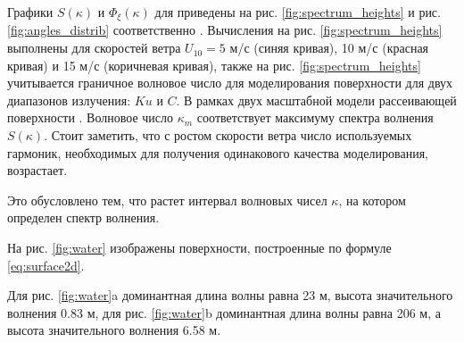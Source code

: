 Графики $S(\kappa)$ и  $\Phi_\xi(\kappa)$ для приведены на рис.
\ref{fig:spectrum_heights} и рис. \ref{fig:angles_distrib} соответственно
\cite{rybkova}. 
Вычисления на рис. \ref{fig:spectrum_heights} выполнены для скоростей ветра 
$U_{10} = 5$ м/с (синяя кривая), 10 м/с (красная кривая) и 15 м/с (коричневая
кривая), также на  рис. \ref{fig:spectrum_heights} учитывается граничное волновое число
для моделирования поверхности для двух диапазонов излучения: $Ku$ и $C$. В
рамках двух масштабной модели  рассеивающей поверхности \cite{bass-and-fuks}.
Волновое число $\kappa_m$ соответствует  максимуму спектра волнения  $S(\kappa)$. Стоит
заметить, что с ростом скорости ветра число используемых гармоник, необходимых
для получения одинакового качества моделирования,
возрастает. 

Это обусловлено тем, что растет интервал волновых чисел $\kappa$, на котором
определен спектр волнения. 

На рис. \ref{fig:water} изображены поверхности,
построенные по формуле \eqref{eq:surface2d}.

Для рис. \ref{fig:water}a доминантная длина волны равна 23 м, высота
значительного волнения 0.83 м, для рис. \ref{fig:water}b доминантная длина
волны равна 206 м, а высота значительного волнения 6.58 м.

